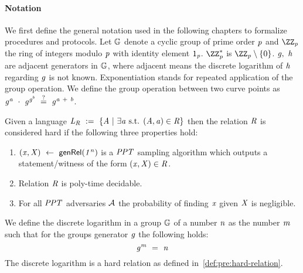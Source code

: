 \paragraph{Notation}
We first define the general notation used in the following chapters to formalize procedures and protocols.
Let $\mathbb{G}$ denote a cyclic group of prime order $\mathit{p}$ and $\cnstIntegersPrime{\varPrime}$ the ring of integers modulo $\mathit{p}$ with identity element $1_{\mathit{p}}$.
$\cnstIntegersPrimeWithoutZero{\varPrime}$ is $\cnstIntegersPrime{\varPrime} \opExcluding \funList{0}$.
$\mathit{g} ,~ \mathit{h}$ are adjacent generators in $\mathbb{G}$, where adjacent means the discrete logarithm of $\mathit{h}$ regarding $\mathit{g}$ is not known.
Exponentiation stands for repeated application of the group operation.
We define the group operation between two curve points as $\mathit{g}^{\mathit{a}} ~\cdot~ \mathit{g}^{\mathit{g}^{\mathit{b}}} ~\stackrel{?}{=}~ \mathit{g}^{\mathit{a} ~+~ \mathit{b}}$.

\begin{definition}\label{def:pre:hard-relation}
    Given a language $\mathit{L}_{\mathit{R}} ~:=~ \{\mathit{A} ~|~ \exists\mathit{a} \text{ s.t. } (\mathit{A}, \mathit{a}) \in \mathit{R}\}$ then the relation $\mathit{R}$ is
    considered hard if the following three properties hold:~\cite{aumayr2020bitcoinchannels}
    \begin{enumerate}
        \item $(\mathit{x}, \mathit{X}) ~\leftarrow~ \mathsf{genRel}(\mathit{1^n})$ is a $\mathit{PPT}$ sampling algorithm which outputs a statement/witness of the form $(\mathit{x}, \mathit{X}) \in \mathit{R}$.
        \item Relation $\mathit{R}$ is poly-time decidable.
        \item For all $\mathit{PPT}$ adversaries $\mathcal{A}$ the probability of finding $\mathit{x}$ given $\mathit{X}$ is negligible.
    \end{enumerate}
\end{definition}

\begin{definition}\label{def:pre:discretelog}
    We define the discrete logarithm in a group $\mathbb{G}$ of a number $\mathit{n}$ as the number $\mathit{m}$ such that for the groups generator $\mathit{g}$ the following holds:
    \[ \mathit{g}^{\mathit{m}} ~=~ \mathit{n} \]
    The discrete logarithm is a hard relation as defined in~\cref{def:pre:hard-relation}.
\end{definition}

